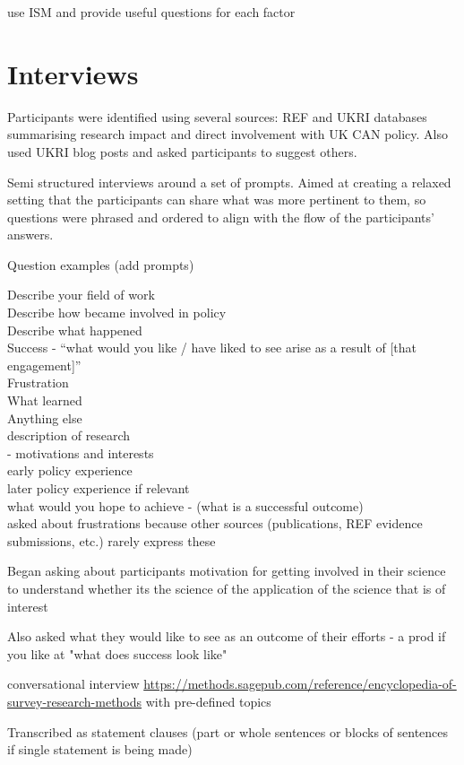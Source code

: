 \cite{MinamitaniDOI2024} use ISM and provide useful questions for each factor

\section{Interviews}
Participants were identified using several sources: REF and UKRI databases summarising research impact and direct involvement with UK CAN policy. Also used UKRI blog posts and asked participants to suggest others.

Semi structured interviews around a set of prompts. Aimed at creating a relaxed setting that the participants can share what was more pertinent to them, so questions were phrased and ordered to align with the flow of the participants' answers.

Question examples (add prompts)

Describe your field of work\\
Describe how became involved in policy\\
Describe what happened\\
Success - ``what would you like / have liked to see arise as a result of [that engagement]''\\
Frustration\\
What learned\\
Anything else\\
description of research\\
 - motivations and interests\\
early policy experience\\
later policy experience if relevant\\
what would you hope to achieve - (what is a successful outcome)\\
asked about frustrations because other sources (publications, REF evidence submissions, etc.) rarely express these

Began asking about participants motivation for getting involved in their science to understand whether its the science of the application of the science that is of interest

Also asked what they would like to see as an outcome of their efforts - a prod if you like at "what does success look like"

conversational interview \url{https://methods.sagepub.com/reference/encyclopedia-of-survey-research-methods} with pre-defined topics

Transcribed as statement clauses (part or whole sentences or blocks of sentences if single statement is being made)

